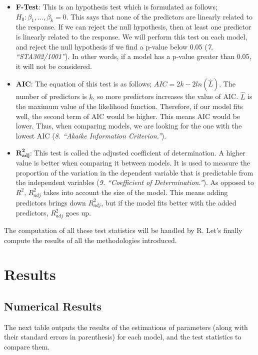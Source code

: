 \documentclass[
]{article}
\begin{document}
\begin{itemize}
\item
  \textbf{F-Test}: This is an hypothesis test which is formulated as
  follows; \(H_0: \beta_1,...,\beta_k =0\). This says that none of the
  predictors are linearly related to the response. If we can reject the
  null hypothesis, then at least one predictor is linearly related to
  the response. We will perform this test on each model, and reject the
  null hypothesis if we find a p-value below 0.05 (\emph{7.
  ``STA302/1001''}). In other words, if a model has a p-value greater
  than 0.05, it will not be considered.
\item
  \textbf{AIC}: The equation of this test is as follows;
  \(AIC = 2k-2ln(\hat{L})\). The number of predictors is \(k\), so more
  predictors increases the value of AIC. \(\hat{L}\) is the maximum
  value of the likelihood function. Therefore, if our model fits well,
  the second term of AIC would be higher. This means AIC would be lower.
  Thus, when comparing models, we are looking for the one with the
  lowest AIC (\emph{8. ``Akaike Information Criterion.''}).
\item
  \(\mathbf{R_{adj}^2}\): This test is called the adjusted coefficient
  of determination. A higher value is better when comparing it between
  models. It is used to measure the proportion of the variation in the
  dependent variable that is predictable from the independent variables
  (\emph{9. ``Coefficient of Determination.''}). As opposed to \(R^2\),
  \(R_{adj}^2\) takes into account the size of the model. This means
  adding predictors brings down \(R_{adj}^2\), but if the model fits
  better with the added predictors, \(R_{adj}^2\) goes up.
\end{itemize}

The computation of all these test statistics will be handled by R. Let's
finally compute the results of all the methodologies introduced.

\hypertarget{results}{%
\section{Results}\label{results}}

\hypertarget{numerical-results}{%
\subsection{Numerical Results}\label{numerical-results}}

The next table outputs the results of the estimations of parameters
(along with their standard errors in parenthesis) for each model, and
the test statistics to compare them.
\end{document}
